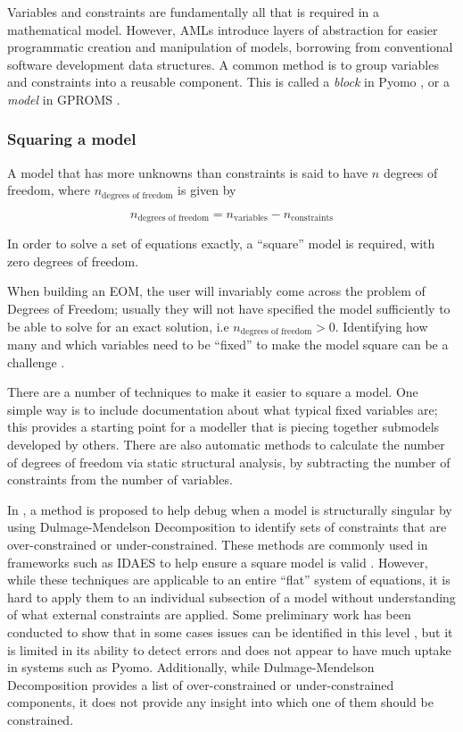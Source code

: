 Variables and constraints are fundamentally all that is
required in a mathematical model. However, AMLs introduce layers of 
abstraction for easier programmatic creation and
manipulation of models, borrowing from conventional software development
data structures. A common method is to group variables and 
constraints into a reusable component. This is called a \textit{block} in Pyomo \citep{hart2011pyomo}, or a 
\textit{model} in GPROMS \citep{amador2019introduction}. 


\hypertarget{squaring-a-model}{%
\subsubsection{Squaring a model}\label{squaring-a-model}}

A model that has more unknowns than constraints is said to have \(n\)
degrees of freedom, where \(n_{\text{degrees\ of\ freedom}}\) is given
by

\[
n_{\text{degrees\ of\ freedom}} =  n_{\text{variables}} - n_{\text{constraints}}
\]

In order to solve a set of equations exactly, a ``square'' model is
required, with zero degrees of freedom.

When building an EOM, the user will invariably come across
the problem of Degrees of Freedom; usually they will not have specified
the model sufficiently to be able to solve for an exact solution, i.e
\(n_{\text{degrees\ of\ freedom}} > 0\). Identifying how many and which
variables need to be ``fixed'' to make the model square can be a
challenge \citep{luyben1996design}.

There are a number of techniques to make it easier to square a model.
One simple way is to include documentation about what typical fixed
variables are; this provides a starting point for a modeller that is
piecing together submodels developed by others. There are also automatic
methods to calculate the number of degrees of freedom via static
structural analysis, by subtracting the number of constraints from the
number of variables.

In \citep{bunus2001debugging}, a method is proposed to help debug when a
model is structurally singular by using Dulmage-Mendelson Decomposition to identify
sets of constraints that are over-constrained or under-constrained.
These methods are commonly used in frameworks such as IDAES to help
ensure a square model is valid \citep{lee2024model}. However, while
these techniques are applicable to an entire ``flat'' system of
equations, it is hard to apply them to an individual subsection of a
model without understanding of what external constraints are applied.
Some preliminary work has been conducted to show that in some cases
issues can be identified in this level \citep{nilsson2008type}, but it
is limited in its ability to detect errors and does not appear to have
much uptake in systems such as Pyomo. Additionally, while Dulmage-Mendelson
Decomposition provides a list of over-constrained or
under-constrained components, it does not provide any insight into
which one of them should be constrained.

